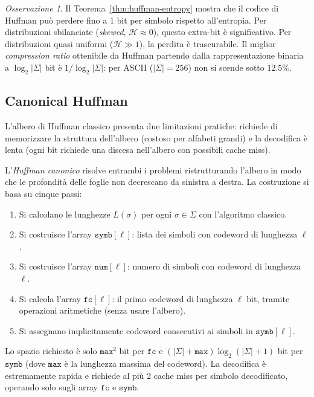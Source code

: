 \documentclass[12pt, a4paper, oneside]{book}
\theoremstyle{plain}
\theoremstyle{definition}
\theoremstyle{remark}
\newtheorem{osservazione}[teorema]{Osservazione}
\begin{document}
\begin{osservazione}
Il Teorema~\ref{thm:huffman-entropy} mostra che il codice di Huffman può perdere fino a 1 bit per simbolo rispetto all'entropia. Per distribuzioni sbilanciate (\emph{skewed}, $\mathcal{H} \approx 0$), questo extra-bit è significativo. Per distribuzioni quasi uniformi ($\mathcal{H} \gg 1$), la perdita è trascurabile. Il miglior \emph{compression ratio} ottenibile da Huffman partendo dalla rappresentazione binaria a $\log_2|\Sigma|$ bit è $1/\log_2|\Sigma|$: per ASCII ($|\Sigma| = 256$) non si scende sotto $12.5\%$.
\end{osservazione}

\subsection{Canonical Huffman}

L'albero di Huffman classico presenta due limitazioni pratiche: richiede di memorizzare la struttura dell'albero (costoso per alfabeti grandi) e la decodifica è lenta (ogni bit richiede una discesa nell'albero con possibili cache miss).

L'\emph{Huffman canonico} risolve entrambi i problemi ristrutturando l'albero in modo che le profondità delle foglie non decrescano da sinistra a destra. La costruzione si basa su cinque passi:

\begin{enumerate}
  \item Si calcolano le lunghezze $L(\sigma)$ per ogni $\sigma \in \Sigma$ con l'algoritmo classico.
  \item Si costruisce l'array $\mathtt{symb}[\ell]$: lista dei simboli con codeword di lunghezza $\ell$.
  \item Si costruisce l'array $\mathtt{num}[\ell]$: numero di simboli con codeword di lunghezza $\ell$.
  \item Si calcola l'array $\mathtt{fc}[\ell]$: il primo codeword di lunghezza $\ell$ bit, tramite operazioni aritmetiche (senza usare l'albero).
  \item Si assegnano implicitamente codeword consecutivi ai simboli in $\mathtt{symb}[\ell]$.
\end{enumerate}

Lo spazio richiesto è solo $\mathtt{max}^2$ bit per $\mathtt{fc}$ e $(|\Sigma| + \mathtt{max})\log_2(|\Sigma| + 1)$ bit per $\mathtt{symb}$ (dove $\mathtt{max}$ è la lunghezza massima del codeword). La decodifica è estremamente rapida e richiede al più 2 cache miss per simbolo decodificato, operando solo sugli array $\mathtt{fc}$ e $\mathtt{symb}$.
\end{document}

